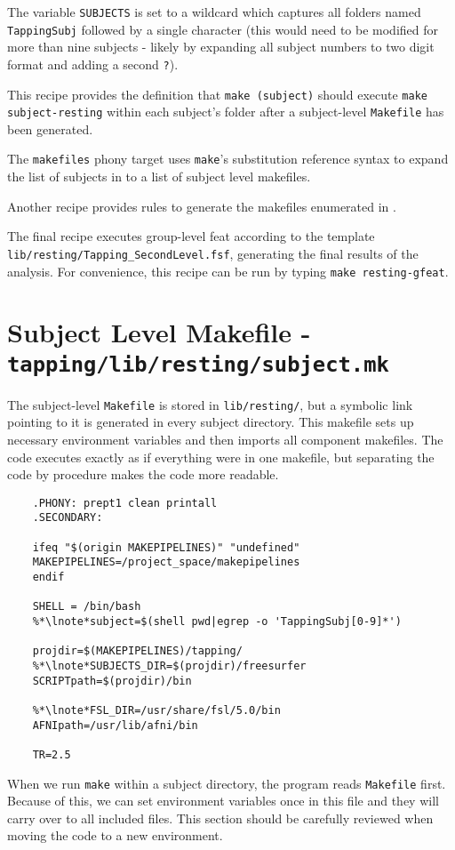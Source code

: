The variable \texttt{SUBJECTS} is set to a wildcard which captures all folders named \texttt{TappingSubj} followed by a single character (this would need to be modified for more than nine subjects - likely by expanding all subject numbers to two digit format and adding a second \texttt{?}). 

This recipe provides the definition that \texttt{make (subject)} should execute \texttt{make subject-resting} within each subject's folder after a subject-level \texttt{Makefile} has been generated.

The \texttt{makefiles} phony target uses \texttt{make}'s substitution reference syntax to expand the list of subjects in to a list of subject level makefiles. 

Another recipe provides rules to generate the makefiles enumerated in . 

The final recipe executes group-level feat according to the
template \texttt{lib/resting/Tapping_SecondLevel.fsf}, generating the
final results of the analysis. For convenience, this recipe can be run by typing \texttt{make resting-gfeat}.

\section{Subject Level Makefile - \texttt{tapping/lib/resting/subject.mk}}
The subject-level \texttt{Makefile} is stored in \texttt{lib/resting/}, but a symbolic link pointing to it is generated in every subject directory. This makefile sets up necessary environment variables and then imports all component makefiles. The code executes exactly as if everything were in one makefile, but separating the code by procedure makes the code more readable.
\begin{lstlisting}
	.PHONY: prept1 clean printall
	.SECONDARY:
	
	ifeq "$(origin MAKEPIPELINES)" "undefined"
	MAKEPIPELINES=/project_space/makepipelines
	endif
	
	SHELL = /bin/bash
	%*\lnote*subject=$(shell pwd|egrep -o 'TappingSubj[0-9]*')
	
	projdir=$(MAKEPIPELINES)/tapping/
	%*\lnote*SUBJECTS_DIR=$(projdir)/freesurfer
	SCRIPTpath=$(projdir)/bin
	
	%*\lnote*FSL_DIR=/usr/share/fsl/5.0/bin
	AFNIpath=/usr/lib/afni/bin
	
	TR=2.5
\end{lstlisting}
When we run \texttt{make} within a subject directory, the program reads \texttt{Makefile} first. Because of this, we can set environment variables once in this file and they will carry over to all included files. This section should be carefully reviewed when moving the code to a new environment.

